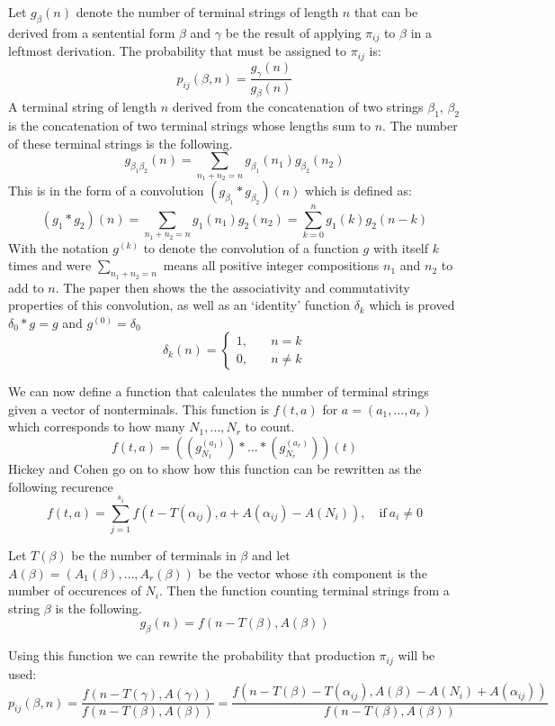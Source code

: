   Let $g_\beta(n)$ denote the number of terminal strings of length $n$ that can be derived from a sentential form $\beta$ and $\gamma$ be the result of applying $\pi_{ij}$ to $\beta$ in a leftmost derivation. The probability that must be assigned to $\pi_{ij}$ is:
  \[
  p_{ij}(\beta, n) = \frac{g_\gamma(n)}{g_\beta(n)}
  \]
  A terminal string of length $n$ derived from the concatenation of two strings $\beta_1$, $\beta_2$ is the concatenation of two terminal strings whose lengths sum to $n$. The number of these terminal strings is the following.
  \[
  g_{\beta_1\beta_2}(n) = \sum_{n_1+n_2=n}g_{\beta_1}(n_1)g_{\beta_2}(n_2)
  \]
  This is in the form of a convolution $(g_{\beta_1} * g_{\beta_2})(n)$ which is defined as:
  \[
  (g_1 * g_2)(n) = \sum_{n_1+n_2=n}g_1(n_1)g_2(n_2) = \sum_{k=0}^{n} g_1(k)g_2(n-k)
  \]
  With the notation $g^{(k)}$ to denote the convolution of a function $g$ with itself $k$ times and were $\sum_{n_1+n_2=n}$ means all positive integer compositions $n_1$ and $n_2$ to add to $n$. The paper then shows the the associativity and commutativity properties of this convolution, as well as an `identity' function $\delta_k$ which is proved $\delta_0 * g = g$ and $g^{(0)} = \delta_0$
  \[
  \delta_k(n) = \left\{\begin{aligned}
    1, \quad & n = k\\
    0, \quad & n \neq k
  \end{aligned}\right.
  \]


  We can now define a function that calculates the number of terminal strings given a vector of nonterminals. This function is $f(t, a)$ for $a = (a_1,\dots,a_r)$ which corresponds to how many $N_1,\dots,N_r$ to count.
  \[
  f(t, a) = \left((g_{N_1}^{(a_1)}) * \hdots * (g_{N_r}^{(a_r)})\right)(t)
  \]
  Hickey and Cohen go on to show how this function can be rewritten as the following recurence
  \[
  f(t,a) = \sum_{j=1}^{s_i}f(t-T(\alpha_{ij}), a+A(\alpha_{ij})-A(N_i)), \quad\mathrm{if}\ a_i \neq 0
  \]

  Let $T(\beta)$ be the number of terminals in $\beta$ and let $A(\beta) = (A_1(\beta),\dots,A_r(\beta))$ be the vector whose $i$th component is the number of occurences of $N_i$. Then the function counting terminal strings from a string $\beta$ is the following.
  \[
  g_\beta(n) = f(n-T(\beta), A(\beta))
  \]

  Using this function we can rewrite the probability that production $\pi_{ij}$ will be used:
  \[
  p_{ij}(\beta, n) = \frac{f(n - T(\gamma), A(\gamma))}{f(n-T(\beta), A(\beta))} = \frac{f(n-T(\beta)-T(\alpha_{ij}),A(\beta)-A(N_i)+A(\alpha_{ij}))}{f(n-T(\beta),A(\beta))}
  \]

